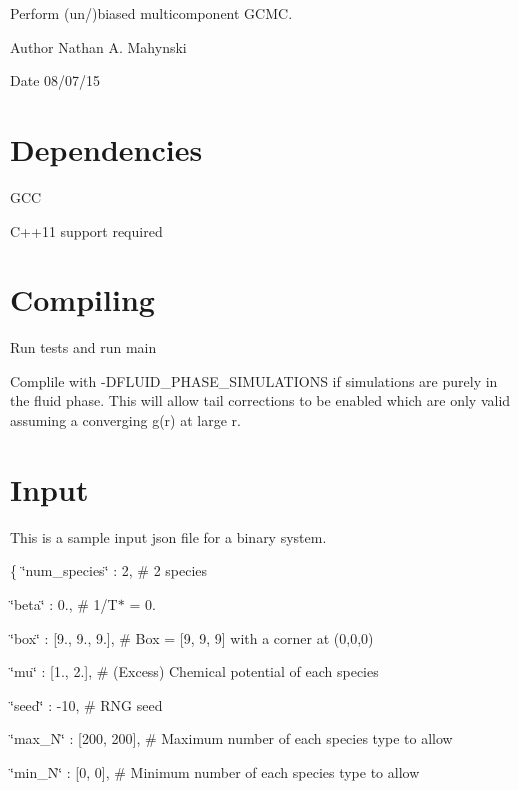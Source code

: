Perform (un/)biased multicomponent G\-C\-M\-C. \begin{DoxyAuthor}{Author}
Nathan A. Mahynski 
\end{DoxyAuthor}
\begin{DoxyDate}{Date}
08/07/15
\end{DoxyDate}
\hypertarget{index_Dependencies}{}\section{Dependencies}\label{index_Dependencies}

\begin{DoxyEnumerate}
\item G\-C\-C
\item C++11 support required
\end{DoxyEnumerate}\hypertarget{index_Compiling}{}\section{Compiling}\label{index_Compiling}
Run tests and run main

Complile with -\/\-D\-F\-L\-U\-I\-D\-\_\-\-P\-H\-A\-S\-E\-\_\-\-S\-I\-M\-U\-L\-A\-T\-I\-O\-N\-S if simulations are purely in the fluid phase. This will allow tail corrections to be enabled which are only valid assuming a converging g(r) at large r.\hypertarget{index_Input}{}\section{Input}\label{index_Input}
This is a sample input json file for a binary system.

\{ \char`\"{}num\-\_\-species\char`\"{} \-: 2, \# 2 species

\char`\"{}beta\char`\"{} \-: 0., \# 1/\-T$\ast$ = 0.

\char`\"{}box\char`\"{} \-: \mbox{[}9., 9., 9.\mbox{]}, \# Box = \mbox{[}9, 9, 9\mbox{]} with a corner at (0,0,0)

\char`\"{}mu\char`\"{} \-: \mbox{[}1., 2.\mbox{]}, \# (Excess) Chemical potential of each species

\char`\"{}seed\char`\"{} \-: -\/10, \# R\-N\-G seed

\char`\"{}max\-\_\-\-N\char`\"{} \-: \mbox{[}200, 200\mbox{]}, \# Maximum number of each species type to allow

\char`\"{}min\-\_\-\-N\char`\"{} \-: \mbox{[}0, 0\mbox{]}, \# Minimum number of each species type to allow

